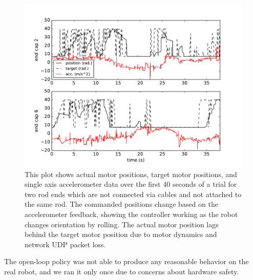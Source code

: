 \begin{figure}[thpb]
    \centering
    \setlength{\unitlength}{0.5\columnwidth}
    \includegraphics[width=\linewidth]{tex/img/plot_motor}
    \caption{
        \label{fig:commands}
        This plot shows actual motor positions, target motor positions, and 
        single axis accelerometer data over the first 40 seconds of a trial
        for two rod ends which are not connected via cables and not attached
        to the same rod. The commanded positions change based on
        the accelerometer feedback, showing the controller working as the robot
        changes orientation by rolling. The actual motor position  
        lags behind the target motor position due to motor dynamics and network UDP packet loss.
    }
\end{figure}

The open-loop policy was not able to produce any reasonable behavior on the real robot, and we ran it only once due to concerns about hardware safety. 


